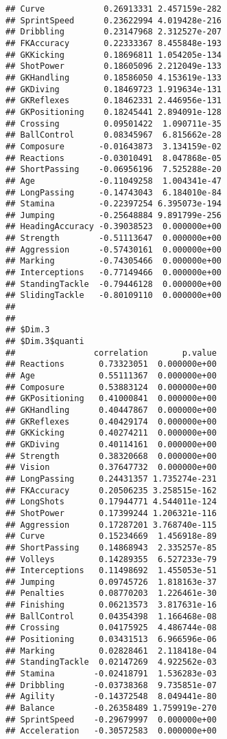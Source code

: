 \documentclass[]{article}
\begin{document}
\begin{verbatim}
## Curve            0.26913331 2.457159e-282
## SprintSpeed      0.23622994 4.019428e-216
## Dribbling        0.23147968 2.312527e-207
## FKAccuracy       0.22333367 8.455848e-193
## GKKicking        0.18696811 1.054205e-134
## ShotPower        0.18605096 2.212049e-133
## GKHandling       0.18586050 4.153619e-133
## GKDiving         0.18469723 1.919634e-131
## GKReflexes       0.18462331 2.446956e-131
## GKPositioning    0.18245441 2.894091e-128
## Crossing         0.09501422  1.090711e-35
## BallControl      0.08345967  6.815662e-28
## Composure       -0.01643873  3.134159e-02
## Reactions       -0.03010491  8.047868e-05
## ShortPassing    -0.06956196  7.525288e-20
## Age             -0.11049258  1.004341e-47
## LongPassing     -0.14743043  6.184010e-84
## Stamina         -0.22397254 6.395073e-194
## Jumping         -0.25648884 9.891799e-256
## HeadingAccuracy -0.39038523  0.000000e+00
## Strength        -0.51113647  0.000000e+00
## Aggression      -0.57430161  0.000000e+00
## Marking         -0.74305466  0.000000e+00
## Interceptions   -0.77149466  0.000000e+00
## StandingTackle  -0.79446128  0.000000e+00
## SlidingTackle   -0.80109110  0.000000e+00
## 
## 
## $Dim.3
## $Dim.3$quanti
##                correlation       p.value
## Reactions       0.73323051  0.000000e+00
## Age             0.55111367  0.000000e+00
## Composure       0.53883124  0.000000e+00
## GKPositioning   0.41000841  0.000000e+00
## GKHandling      0.40447867  0.000000e+00
## GKReflexes      0.40429174  0.000000e+00
## GKKicking       0.40274211  0.000000e+00
## GKDiving        0.40114161  0.000000e+00
## Strength        0.38320668  0.000000e+00
## Vision          0.37647732  0.000000e+00
## LongPassing     0.24431357 1.735274e-231
## FKAccuracy      0.20506235 3.258515e-162
## LongShots       0.17944771 4.544011e-124
## ShotPower       0.17399244 1.206321e-116
## Aggression      0.17287201 3.768740e-115
## Curve           0.15234669  1.456918e-89
## ShortPassing    0.14868943  2.335257e-85
## Volleys         0.14289355  6.527233e-79
## Interceptions   0.11498692  1.455053e-51
## Jumping         0.09745726  1.818163e-37
## Penalties       0.08770203  1.226461e-30
## Finishing       0.06213573  3.817631e-16
## BallControl     0.04354398  1.166468e-08
## Crossing        0.04175925  4.486744e-08
## Positioning     0.03431513  6.966596e-06
## Marking         0.02828461  2.118418e-04
## StandingTackle  0.02147269  4.922562e-03
## Stamina        -0.02418791  1.536283e-03
## Dribbling      -0.03738368  9.735851e-07
## Agility        -0.14372548  8.049441e-80
## Balance        -0.26358489 1.759919e-270
## SprintSpeed    -0.29679997  0.000000e+00
## Acceleration   -0.30572583  0.000000e+00
\end{verbatim}
\end{document}
